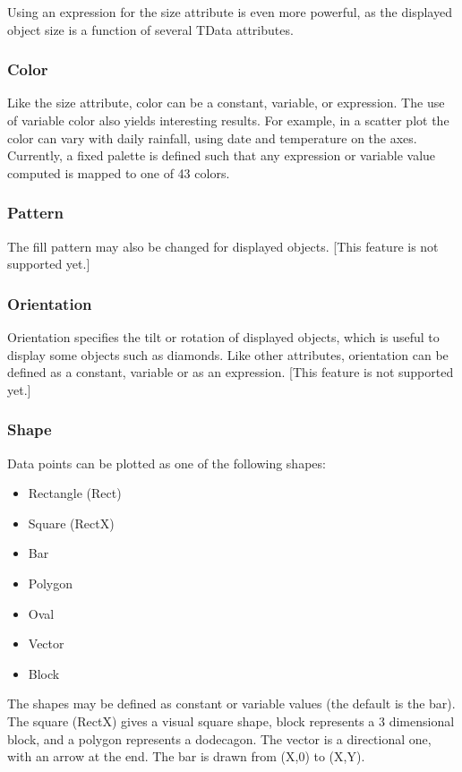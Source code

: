 Using an expression for the size attribute is even more powerful, as the
displayed object size is a function of several TData attributes.

\subsubsection{Color}

Like the size attribute, color can be a constant, variable, or expression. The
use of variable color also yields interesting results. For example, in a scatter
plot the color can vary with daily rainfall, using date and temperature on the
axes. Currently, a fixed palette is defined such that any expression or variable
value computed is mapped to one of 43 colors.

\subsubsection{Pattern}

The fill pattern may also be changed for displayed objects. [This feature is
not supported yet.]

\subsubsection{Orientation}

Orientation specifies the tilt or rotation of displayed objects, which is useful
to display some objects such as diamonds. Like other attributes, orientation can
be defined as a constant, variable or as an expression. [This feature is not
supported yet.]

\subsubsection{Shape}

Data points can be plotted as one of the following shapes:

\begin{itemize}
	\item Rectangle (Rect)
	\item Square (RectX)
	\item Bar
	\item Polygon
	\item Oval
	\item Vector
	\item Block
\end{itemize}

The shapes may be defined as constant or variable values (the default is the
bar). The square (RectX) gives a visual square shape, block represents a 3
dimensional block, and a polygon represents a dodecagon. The vector is a
directional one, with an arrow at the end. The bar is drawn from (X,0) to (X,Y).

